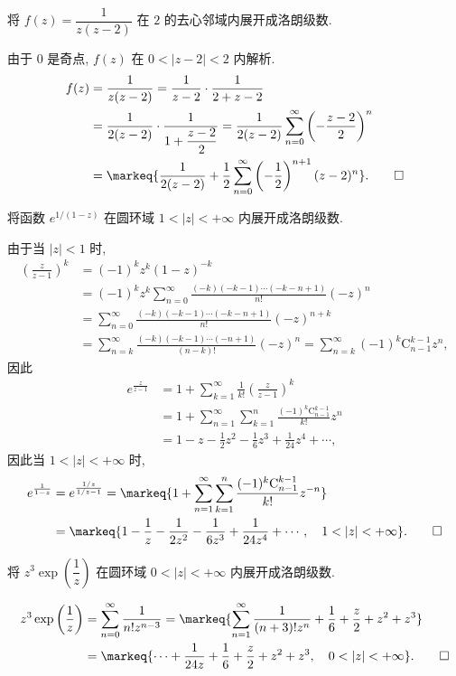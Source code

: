 \begin{exercise}
	将 $f(z)=\dfrac1{z(z-2)}$ 在 $2$ 的去心邻域内展开成洛朗级数.
\end{exercise}
\begin{solution}
	由于 $0$ 是奇点, $f(z)$ 在 $0<|z-2|<2$ 内解析.
	\begin{align*}
		f(z)&=\frac1{z(z-2)}=\frac1{z-2}\cdot\frac1{2+z-2}\\
		&=\frac1{2(z-2)}\cdot\frac1{1+\dfrac{z-2}2}
		=\frac1{2(z-2)}\sum_{n=0}^\infty\left(-\frac{z-2}2\right)^n\\
		&=\markeq{\frac1{2(z-2)}+\frac12\sum_{n=0}^\infty\left(-\frac12\right)^{n+1}(z-2)^n}.\qedhere
	\end{align*}
\end{solution}


\begin{exercise}
	将函数 $e^{1/(1-z)}$ 在圆环域 $1<|z|<+\infty$ 内展开成洛朗级数.
\end{exercise}
\begin{solution}
	由于当 $|z|<1$ 时,
	\begin{align*}
		\left(\frac{z}{z-1}\right)^k
		&=(-1)^kz^k(1-z)^{-k}\\
		&=(-1)^kz^k\sum_{n=0}^\infty\frac{(-k)(-k-1)\cdots(-k-n+1)}{n!}(-z)^n\\
		&=\sum_{n=0}^\infty\frac{(-k)(-k-1)\cdots(-k-n+1)}{n!}(-z)^{n+k}\\
		&=\sum_{n=k}^\infty\frac{(-k)(-k-1)\cdots(-n+1)}{(n-k)!}(-z)^n=\sum_{n=k}^\infty (-1)^k\mathrm{C}_{n-1}^{k-1}z^n,
\end{align*}
因此
\begin{align*}
	e^{\frac{z}{z-1}}&=1+\sum_{k=1}^\infty\frac1{k!}\left(\frac{z}{z-1}\right)^k\\
	&=1+\sum_{n=1}^\infty\sum_{k=1}^n \frac{(-1)^k\mathrm{C}_{n-1}^{k-1}}{k!}z^n\\
	&=1-z-\frac12z^2-\frac16z^3+\frac1{24}z^4+\cdots,
\end{align*}
	因此当 $1<|z|<+\infty$ 时,
	\begin{align*}
	e^{\frac1{1-z}}&=e^{\frac{1/z}{1/z-1}}
	=\markeq{1+\sum_{n=1}^\infty\sum_{k=1}^n \frac{(-1)^k\mathrm{C}_{n-1}^{k-1}}{k!}z^{-n}}\\
	&=\markeq{1-\frac1z-\frac1{2z^2}-\frac1{6z^3}+\frac1{24z^4}+\cdots,\quad 1<|z|<+\infty}.\qedhere
	\end{align*}
\end{solution}


\begin{exercise}
	将 $z^3\exp\left(\dfrac1z\right)$ 在圆环域 $0<|z|<+\infty$ 内展开成洛朗级数.
\end{exercise}
\begin{solution}
	\begin{align*}
	z^3\exp\left(\frac1z\right)&=\sum_{n=0}^\infty\frac{1}{n!z^{n-3}}
	=\markeq{\sum_{n=1}^\infty\frac1{(n+3)! z^n}+\frac16+\frac z2+z^2+z^3}\\
	&=\markeq{\cdots+\frac1{24z}+\frac16+\frac z2+z^2+z^3,\quad 0<|z|<+\infty}.\qedhere
	\end{align*}
\end{solution}


